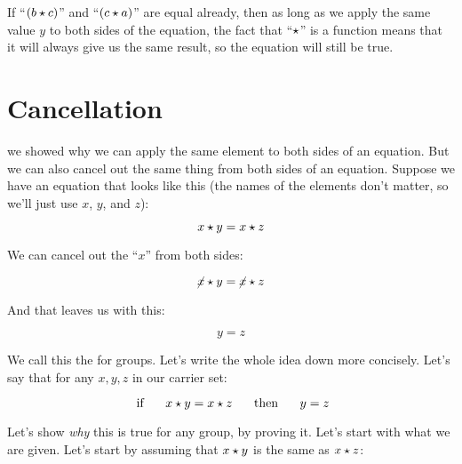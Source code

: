 \documentclass[../../../main.tex]{subfiles}
\begin{document}
If ``$(\op{b}{c})$'' and ``$(\op{c}{a})$'' are equal already, then as long as we apply the same value $y$ to both sides of the equation, the fact that ``$\opSymbol/$'' is a function means that it will always give us the same result, so the equation will still be true.


\section{Cancellation}

 we showed why we can apply the same element to both sides of an equation. But we can also cancel out the same thing from both sides of an equation. Suppose we have an equation that looks like this (the names of the elements don't matter, so we'll just use $x$, $y$, and $z$):

\begin{equation*}
  \op{x}{y} = \op{x}{z}
\end{equation*}

We can cancel out the ``$x$'' from both sides:

\begin{equation*}
  \op{\cancel{x}}{y} = \op{\cancel{x}}{z}
\end{equation*}

And that leaves us with this:

\begin{equation*}
  y = z
\end{equation*}

We call this the  for groups. Let's write the whole idea down more concisely. Let's say that for any $x, y, z$ in our carrier set:

\begin{equation*}
  \text{ if } \hskip 0.5cm 
  \op{x}{y} = \op{x}{z} \hskip 0.5cm 
  \text{ then } \hskip 0.5cm  
  y = z
\end{equation*}

Let's show \emph{why} this is true for any group, by proving it. Let's start with what we are given. Let's start by assuming that $\op{x}{y}$ is the same as $\op{x}{z}$:
\end{document}
